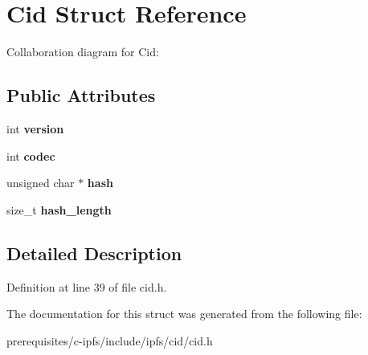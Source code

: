 \hypertarget{struct_cid}{}\section{Cid Struct Reference}
\label{struct_cid}


Collaboration diagram for Cid\+:
\subsection*{Public Attributes}
\begin{DoxyCompactItemize}
\item 
\mbox{\label{struct_cid_a8fbf8c291cffc218ab8eeadcea92494a}} 
int {\bfseries version}
\item 
\mbox{\label{struct_cid_a9bf14cd589e28d403a09d499e71260ea}} 
int {\bfseries codec}
\item 
\mbox{\label{struct_cid_aee9c3980c5646aa33208d088d8000b7f}} 
unsigned char $\ast$ {\bfseries hash}
\item 
\mbox{\label{struct_cid_aa2f4c17364c1b3f246a05d00cee68f54}} 
size\+\_\+t {\bfseries hash\+\_\+length}
\end{DoxyCompactItemize}


\subsection{Detailed Description}


Definition at line 39 of file cid.\+h.



The documentation for this struct was generated from the following file\+:\begin{DoxyCompactItemize}
\item 
prerequisites/c-\/ipfs/include/ipfs/cid/cid.\+h\end{DoxyCompactItemize}
